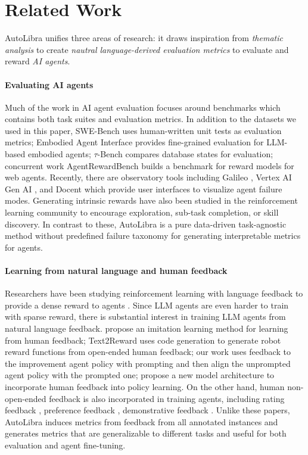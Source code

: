 \section{Related Work}
AutoLibra unifies three areas of research: it draws inspiration from \textit{thematic
analysis} to create \textit{nautral language-derived evaluation metrics} to evaluate
and reward \textit{AI agents}.

\paragraph{Evaluating AI agents}
Much of the work in AI agent evaluation focuses around benchmarks which contains
both task suites and evaluation metrics. In addition to the datasets we used in
this paper, SWE-Bench \citep{jimenezswe} uses human-written unit tests as
evaluation metrics; Embodied Agent Interface \citep{li2024embodied} provides
fine-grained evaluation for LLM-based embodied agents; $\tau$-Bench \citep{yao2024tau}
compares database states for evaluation; concurrent work AgentRewardBench \citep{lù2025agentrewardbenchevaluatingautomaticevaluations}
builds a benchmark for reward models for web agents. Recently, there are
observatory tools including Galileo \citep{galileo_agentic}, Vertex AI Gen AI
\citep{google_agent_eval}, and Docent \citep{meng2025docent} which provide user interfaces
to visualize agent failure modes. Generating intrinsic rewards have also been
studied in the reinforcement learning community \citep{du2019liir,pathakICMl17curiosity,laskin2022cic}
to encourage exploration, sub-task completion, or skill discovery. In contrast
to these, AutoLibra is a pure data-driven task-agnostic method without predefined
failure taxonomy for generating interpretable metrics for agents.

\paragraph{Learning from natural language and human feedback}
Researchers have been studying reinforcement learning with language feedback to
provide a dense reward to agents \citep{goyal2019using}. Since LLM agents are
even harder to train with sparse reward, there is substantial interest in training
LLM agents from natural language feedback. \citet{chen2024learning} propose an imitation
learning method for learning from human feedback; Text2Reward \citep{xietext2reward}
uses code generation to generate robot reward functions from open-ended human feedback;
our work \citep{chen2025fine} uses feedback to the improvement agent policy with
prompting and then align the unprompted agent policy with the prompted one;
\citet{shi2024yell} propose a new model architecture to incorporate human feedback
into policy learning. On the other hand, human non-open-ended feedback is also incorporated
in training agents, including rating feedback \citep{nguyen2017reinforcement},
preference feedback \citep{christiano2017deep}, demonstrative feedback \citep{shaikhaligning}.
Unlike these papers, AutoLibra induces metrics from feedback from all annotated instances
and generates metrics that are generalizable to different tasks and useful for both
evaluation and agent fine-tuning.

